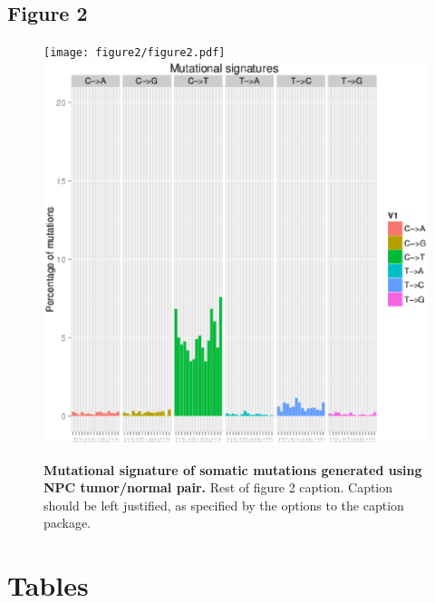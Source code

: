 \documentclass[10pt]{article}
\begin{document}
\subsection*{Figure 2}
\begin{figure}[!ht]
\begin{center}
\ifpdf
% 
\texttt{[image: figure2/figure2.pdf]}
\else
\includegraphics[width=6in]{figure2/mutation_signature.15.30.48_November_05_2013.eps}
\fi
\end{center}
\caption{
{\bf Mutational signature of somatic mutations generated using NPC tumor/normal pair.}  Rest of figure 2  caption.  Caption 
should be left justified, as specified by the options to the caption 
package.
}
\label{Figure_label2}
\end{figure}

\section*{Tables}
\end{document}
